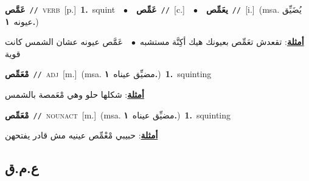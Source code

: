\documentclass[10pt,a4paper,twoside]{article} %
\begin{document}
\begin{multicols}{2}
{\setlength\topsep{0pt}\textbf{\foreignlanguage{arabic}{عَمَّص}}\ {\color{gray}\texttt{//}\color{black}}\ \textsc{verb}\ [p.]\ \textbf{1.}~squint\ \ $\bullet$\ \ \setlength\topsep{0pt}\textbf{\foreignlanguage{arabic}{عَمِّص}}\ {\color{gray}\texttt{//}\color{black}}\ [c.]\ \ $\bullet$\ \ \setlength\topsep{0pt}\textbf{\foreignlanguage{arabic}{يعَمِّص}}\ {\color{gray}\texttt{//}\color{black}}\ [i.]\ \color{gray}(msa. \foreignlanguage{arabic}{يُضَيِّق عيونه}~\foreignlanguage{arabic}{\textbf{١.}})\color{black}\  \begin{flushright}\color{gray}\foreignlanguage{arabic}{\textbf{\underline{\foreignlanguage{arabic}{أمثلة}}}: تقعدش تعَمِّص بعيونك هيك أكِنَّة مستشبه\ $\bullet$\ \  عَمَّص عيونه عشان الشمس كانت قوية}\end{flushright}\color{black}} \vspace{2mm}

{\setlength\topsep{0pt}\textbf{\foreignlanguage{arabic}{مْعَمِّص}}\ {\color{gray}\texttt{//}\color{black}}\ \textsc{adj}\ [m.]\ \color{gray}(msa. \foreignlanguage{arabic}{مضيِّق عيناه}~\foreignlanguage{arabic}{\textbf{١.}})\color{black}\ \textbf{1.}~squinting\  \begin{flushright}\color{gray}\foreignlanguage{arabic}{\textbf{\underline{\foreignlanguage{arabic}{أمثلة}}}: شكلها حلو وهي مْعَمصة بالشمس}\end{flushright}\color{black}} \vspace{2mm}

{\setlength\topsep{0pt}\textbf{\foreignlanguage{arabic}{مْعَمِّص}}\ {\color{gray}\texttt{//}\color{black}}\ \textsc{noun\textunderscore act}\ [m.]\ \color{gray}(msa. \foreignlanguage{arabic}{مضيِّق عيناه}~\foreignlanguage{arabic}{\textbf{١.}})\color{black}\ \textbf{1.}~squinting\  \begin{flushright}\color{gray}\foreignlanguage{arabic}{\textbf{\underline{\foreignlanguage{arabic}{أمثلة}}}: حبيبي مْعْمِّص عينيه مش قادر يفتحهن}\end{flushright}\color{black}} \vspace{2mm}

\vspace{-3mm}
\subsection*{\color{blue}\foreignlanguage{arabic}{ع.م.ق}\color{blue}{}} 


\end{multicols}
\end{document}
